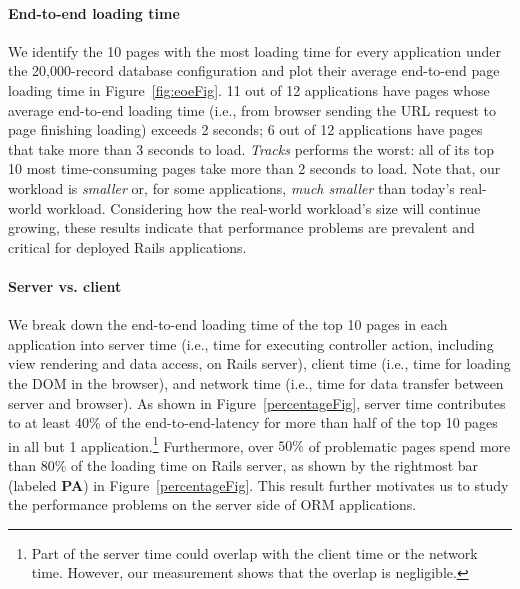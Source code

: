 \paragraph{\bf{End-to-end loading time}} 
We identify the 10 pages with the most loading time for every application under the 20,000-record database configuration and plot their average end-to-end page loading time in
Figure~\ref{fig:eoeFig}. 11 out of 12 applications have pages whose average end-to-end loading time (i.e., from browser sending the URL request to page finishing loading) exceeds 2 seconds; 6 out of 12 applications have pages that take more than 3 seconds to load. \textit{Tracks} performs the worst: all of its top 10 most time-consuming pages take more than 2 seconds to load. 
Note that, our workload is 
{\it smaller} or, for some applications, {\it much smaller} than today's real-world workload. Considering how the real-world workload's size will continue growing,
these results indicate that performance problems are prevalent and critical for deployed Rails applications.

\vspace{-0.08in} 
\paragraph{\bf{Server vs. client}}
We break down the end-to-end loading time of the top 10 pages in each 
application into server time (i.e., time for executing controller action, including view rendering and data access, on Rails server), 
client time (i.e., time for loading the DOM in the browser), and network time (i.e., time for data transfer between server and browser).  %
As shown in Figure~\ref{percentageFig}, server time contributes to at least 40\% of the end-to-end-latency for more than half of the top 10 pages in all but 1 application.\footnote{Part of the server time could overlap with the client time or the network time. However, our measurement shows that the overlap is negligible.}
Furthermore, over $50\%$ of problematic pages spend more than 80\% of the loading time on Rails server, as shown by the rightmost bar (labeled {\bf PA}) in Figure~\ref{percentageFig}.
This result further motivates us to study the performance problems on the server side of ORM applications.
\vspace{-0.08in} 
